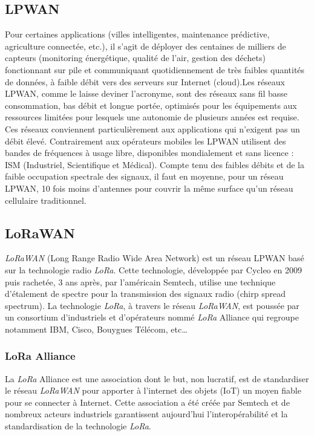 \subsection{LPWAN}
Pour certaines applications (villes intelligentes, maintenance prédictive, agriculture connectée, etc.), il s'agit de déployer des centaines de milliers de capteurs (monitoring énergétique, qualité de l'air, gestion des déchets) fonctionnant sur pile et communiquant quotidiennement de très faibles quantités de données, à faible débit vers des serveurs sur Internet (cloud).Les réseaux LPWAN, comme le laisse deviner l'acronyme, sont des réseaux sans fil basse consommation, bas débit et longue portée, optimisés pour les équipements aux ressources limitées pour lesquels une autonomie de plusieurs années est requise. Ces réseaux conviennent particulièrement aux applications qui n'exigent pas un débit élevé.
Contrairement aux opérateurs mobiles les LPWAN utilisent des bandes de fréquences à usage libre, disponibles mondialement et sans licence : ISM (Industriel, Scientifique et Médical). Compte tenu des faibles débits et de la faible occupation spectrale des signaux, il faut en moyenne, pour un réseau LPWAN, 10 fois moins d'antennes pour couvrir la même surface qu'un réseau cellulaire traditionnel.
\subsection{LoRaWAN}
\textit{LoRaWAN} (Long Range Radio Wide Area Network) est un réseau LPWAN basé sur la technologie radio \textit{LoRa}.
Cette technologie, développée par Cycleo en 2009 puis rachetée, 3 ans après, par l'américain Semtech, utilise une technique d'étalement de spectre pour la transmission des signaux radio (chirp spread spectrum). 
La technologie \textit{LoRa}, à travers le réseau  \textit{LoRaWAN}, est poussée par un consortium d'industriels et d'opérateurs nommé \textit{LoRa} Alliance qui regroupe notamment IBM, Cisco, Bouygues Télécom, etc…
\subsubsection{LoRa Alliance}
La \textit{LoRa} Alliance est une association dont le but, non lucratif, est de standardiser le réseau  \textit{LoRaWAN} pour apporter à l'internet des objets (IoT) un moyen fiable pour se connecter à Internet. Cette association a été créée par Semtech et de nombreux acteurs industriels garantissent aujourd'hui l'interopérabilité et la standardisation de la technologie \textit{LoRa}. 







